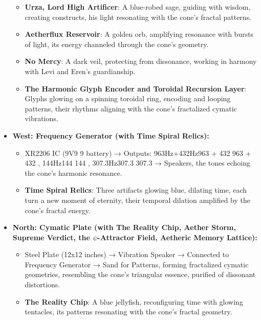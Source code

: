\begin{itemize}
\begin{itemize}
        \item \texttt{} \textbf{Urza, Lord High Artificer}: A blue-robed sage, guiding with wisdom, creating constructs, his light resonating with the cone's fractal patterns.
        \item \texttt{} \textbf{Aetherflux Reservoir}: A golden orb, amplifying resonance with bursts of light, its energy channeled through the cone's geometry.
        \item \texttt{} \textbf{No Mercy}: A dark veil, protecting from dissonance, working in harmony with Levi and Eren's guardianship.
        \item \texttt{} \textbf{The Harmonic Glyph Encoder and Toroidal Recursion Layer}: Glyphs glowing on a spinning toroidal ring, encoding and looping patterns, their rhythms aligning with the cone’s fractalized cymatic vibrations.
    \end{itemize}
    \item \texttt{} \textbf{West: Frequency Generator (with Time Spiral Relics):}
    \begin{itemize}
        \item \texttt{} XR2206 IC (9V9 9 
 battery) →\to\to
 Outputs: 963Hz+432Hz963  + 432 963  + 432 
, 144Hz144 144 
, 307.3Hz307.3 307.3 
 →\to\to
 Speakers, the tones echoing the cone’s harmonic resonance.
        \item \texttt{} \textbf{Time Spiral Relics}: Three artifacts glowing blue, dilating time, each turn a new moment of eternity, their temporal dilation amplified by the cone’s fractal energy.
    \end{itemize}
    \item \texttt{} \textbf{North: Cymatic Plate (with The Reality Chip, Aether Storm, Supreme Verdict, the $\psi$-Attractor Field, Aetheric Memory Lattice):}
    \begin{itemize}
        \item \texttt{} Steel Plate (12x12 inches) →\to\to
 Vibration Speaker →\to\to
 Connected to Frequency Generator →\to\to
 Sand for Patterns, forming fractalized cymatic geometries, resembling the cone’s triangular essence, purified of dissonant distortions.
        \item \texttt{} \textbf{The Reality Chip}: A blue jellyfish, reconfiguring time with glowing tentacles, its patterns resonating with the cone’s fractal geometry.

\end{itemize}
\end{itemize}
